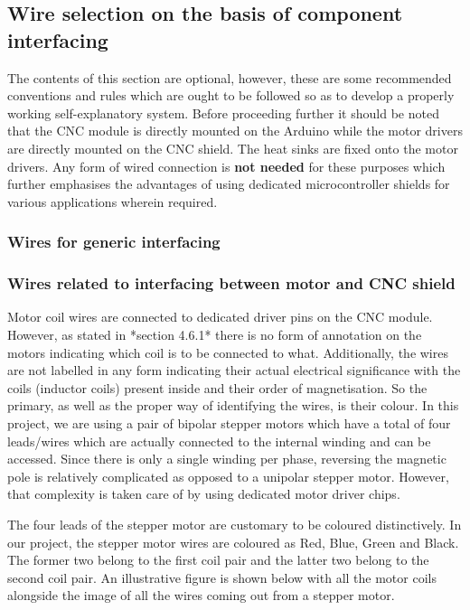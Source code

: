 \subsection{Wire selection on the basis of component interfacing}

The contents of this section are optional, however, these are some recommended conventions and rules which are ought to be followed so as to develop a properly working self-explanatory system. Before proceeding further it should be noted that the CNC module is directly mounted on the Arduino while the motor drivers are directly mounted on the CNC shield. The heat sinks are fixed onto the motor drivers. Any form of wired connection is \textbf{not needed} for these purposes which further emphasises the advantages of using dedicated microcontroller shields for various applications wherein required. 

\subsubsection*{Wires for generic interfacing}

\subsubsection*{Wires related to interfacing between motor and CNC shield}

Motor coil wires are connected to dedicated driver pins on the CNC module. However, as stated in *section 4.6.1* there is no form of annotation on the motors indicating which coil is to be connected to what. Additionally, the wires are not labelled in any form indicating their actual electrical significance with the coils (inductor coils) present inside and their order of magnetisation. So the primary, as well as the proper way of identifying the wires, is their colour. In this project, we are using a pair of bipolar stepper motors which have a total of four leads/wires which are actually connected to the internal winding and can be accessed. Since there is only a single winding per phase, reversing the magnetic pole is relatively complicated as opposed to a unipolar stepper motor. However, that complexity is taken care of by using dedicated motor driver chips. \par
 
The four leads of the stepper motor are customary to be coloured distinctively. In our project, the stepper motor wires are coloured as Red, Blue, Green and Black. The former two belong to the first coil pair and the latter two belong to the second coil pair. An illustrative figure is shown below with all the motor coils alongside the image of all the wires coming out from a stepper motor.

